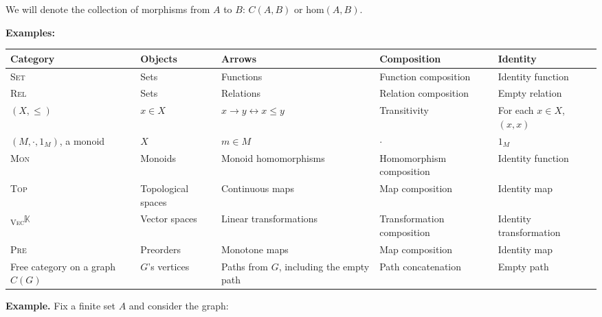 We will denote the collection of morphisms from $A$ to $B$: $C(A, B)$ or $\mathrm{hom}(A, B)$.

\textbf{Examples:}
\begin{center}
\begin{tabular}{ |p{2cm}|p{2cm}|p{3cm}|p{3cm}|p{3cm}| } 
 \hline
 Category & Objects & Arrows & Composition & Identity\\ 
 \hline
 \hline
 \textsc{Set} & Sets & Functions & Function composition & Identity function\\ 
 \hline
 \textsc{Rel} & Sets & Relations & Relation composition & Empty relation\\
 \hline
 $(X, \leq)$ & $x\in X$ & $x \to y \leftrightarrow x \leq y $ & Transitivity & For each $x\in X$, $(x, x)$ \\
 \hline
 $(M, \cdot, 1_M)$, a monoid & ${X}$ & $m \in M$ & $\cdot$ & $1_M$ \\
 \hline
 \textsc{Mon} & Monoids & Monoid homomorphisms & Homomorphism composition & Identity function \\
 \hline
 \textsc{Top} & Topological spaces & Continuous maps & Map composition & Identity map \\
 \hline
 \textsubscript{\textsc{Vec}}{$\mathbb{K}$} & Vector spaces & Linear transformations & Transformation composition & Identity transformation \\
 \hline
 \textsc{Pre} & Preorders & Monotone maps & Map composition & Identity map \\
 Free category on a graph $C(G)$ & $G$'s vertices &Paths from $G$, including the empty path& Path concatenation & Empty path \\
 \hline
\end{tabular}
\end{center}

\textbf{Example.} Fix a finite set $A$ and consider the graph:
\begin{figure}
\end{figure}

